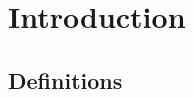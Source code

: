 \documentclass[a4paper,11pt,twoside,openany]{book}
\begin{document}
\section{Introduction}




\subsection{Definitions}

\end{document}
